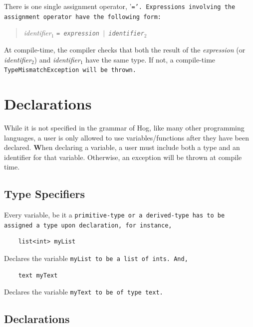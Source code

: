 \documentclass{article}
\begin{document}
There is one single assignment operator, '\tt =\rm'. Expressions involving the
assignment operator have the following form:

\begin{quotation}
\emph{identifier}$_1$ \tt = \rm \emph{expression} $|$ \emph{identifier}$_2$
\end{quotation}

At compile-time, the compiler checks that both the result of the \emph{expression} (or \emph{identifier}$_2$) and
\emph{identifier}$_1$ have the same type. If not, a compile-time \tt TypeMismatchException \rm will be thrown.




\section{Declarations} %
\label{sec:declarations}

While it is not specified in the grammar of Hog, like many other programming
languages, a user is only allowed to use variables/functions after they have been
declared. \textbf When declaring a variable, a user must include both a type and an 
identifier for that variable. Otherwise, an exception will be thrown at compile time.

\subsection{Type Specifiers} %
\label{sub:type_specifiers}

Every variable, be it a \tt primitive-type \rm or a \tt derived-type \rm has to be
assigned a type upon declaration, for instance,

\begin{verbatim}
    list<int> myList
\end{verbatim}

Declares the variable \tt myList \rm to be a \tt list \rm of \tt int\rm s. And,

\begin{verbatim}
    text myText
\end{verbatim}

Declares the variable \tt myText \rm to be of type \tt text\rm .


\subsection{Declarations} %
\label{sub:declarations}
\end{document}
